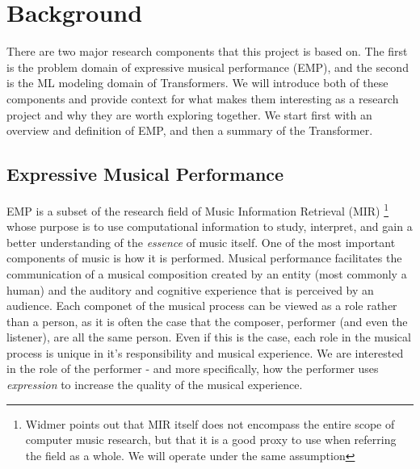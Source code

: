 \chapter{Background}\label{ch:ch2}


There are two major research components that this project is based on. The first is the problem domain of expressive musical performance (EMP), and the second is the ML modeling domain of Transformers. We will introduce both of these components and provide context for what makes them interesting as a research project and why they are worth exploring together. We start first with an overview and definition of EMP, and then a summary of the Transformer. 

\section{Expressive Musical Performance}
EMP is a subset of the research field of Music Information Retrieval (MIR) \footnote{Widmer\cite{widmer2016getting} points out that MIR itself does not encompass the entire scope of computer music research, but that it is a good proxy to use when referring the field as a whole. We will operate under the same assumption} whose purpose is to use computational information to study, interpret, and gain a better understanding of the \emph{essence} of music itself. One of the most important components of music is how it is performed. Musical performance facilitates the communication of a musical composition created by an entity (most commonly a human) and the auditory and cognitive experience that is perceived by an audience. Each componet of the musical process can be viewed as a role rather than a person, as it is often the case that the composer, performer (and even the listener), are all the same person. Even if this is the case, each role in the musical process is unique in it's responsibility and musical experience. We are interested in the role of the performer - and more specifically, how the performer uses \emph{expression} to increase the quality of the musical experience.

